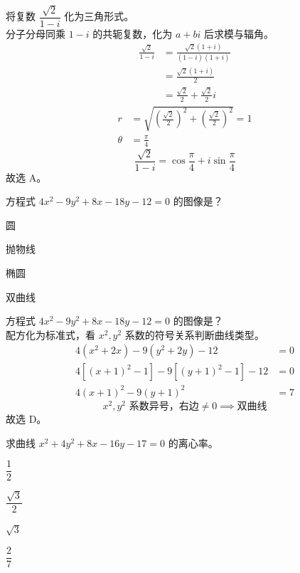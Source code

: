 \documentclass[12pt,a4paper]{exam-zh}
\begin{document}
\begin{solution}
    将复数 $\dfrac{\sqrt{2}}{1-i}$ 化为三角形式。 \\
    分子分母同乘 $1-i$ 的共轭复数，化为 $a+bi$ 后求模与辐角。 \\
    \begin{align*}
        \frac{\sqrt{2}}{1-i} &= \frac{\sqrt{2}(1+i)}{(1-i)(1+i)} \\
        &= \frac{\sqrt{2}(1+i)}{2} \\
        &= \frac{\sqrt{2}}{2}+\frac{\sqrt{2}}{2}i
    \end{align*}
    \begin{align*}
        r &= \sqrt{\left(\frac{\sqrt{2}}{2}\right)^2+\left(\frac{\sqrt{2}}{2}\right)^2} = 1 \\
        \theta &= \frac{\pi}{4}
    \end{align*}
    \[
        \frac{\sqrt{2}}{1-i} = \cos\frac{\pi}{4}+i\sin\frac{\pi}{4}
    \]
    故选 A。
\end{solution}

\begin{question}
    方程式 $4x^2-9y^2+8x-18y-12=0$ 的图像是？ \paren[2]
    \begin{choices}
        \item 圆
        \item 抛物线
        \item 椭圆
        \item 双曲线
    \end{choices}
\end{question}

\begin{solution}
    方程式 $4x^2-9y^2+8x-18y-12=0$ 的图像是？ \\
    配方化为标准式，看 $x^2,y^2$ 系数的符号关系判断曲线类型。 \\
    \begin{align*}
        4(x^2+2x)-9(y^2+2y)-12 &= 0 \\
        4\left[(x+1)^2-1\right]-9\left[(y+1)^2-1\right]-12 &= 0 \\
        4(x+1)^2-9(y+1)^2 &= 7
    \end{align*}
    \[
        x^2,y^2 \text{ 系数异号，右边} \neq 0 \implies \text{双曲线}
    \]
    故选 D。
\end{solution}

\begin{question}
    求曲线 $x^2+4y^2+8x-16y-17=0$ 的离心率。 \paren[2]
    \begin{choices}
        \item $\dfrac{1}{2}$
        \item $\dfrac{\sqrt3}{2}$
        \item $\sqrt3$
        \item $\dfrac{2}{7}$
    \end{choices}
\end{question}
\end{document}
